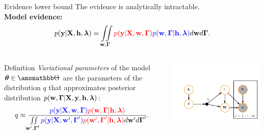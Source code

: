 \documentclass[usenames,dvipsnames,11pt,pdf,utf8,russian,aspectratio=169]{beamer}
\begin{document}
\begin{frame}{Evidence lower bound} 
\footnotesize
The evidence is analytically intractable.\\
\textbf{Model evidence:}
\[
p(\mathbf{y}|\mathbf{X}, \mathbf{h}, \boldsymbol{\lambda}) =
 \iint\limits_{\mathbf{w}, \boldsymbol{\Gamma}}  \textcolor{red}{p(\mathbf{y}|\mathbf{X},\mathbf{w},  \boldsymbol{\Gamma})} \textcolor{blue}{p(\mathbf{w}, \boldsymbol{\Gamma}|\mathbf{h}, \boldsymbol{\lambda})}d\mathbf{w}d{\boldsymbol{\Gamma}}.                         
\]

\begin{columns}
\begin{column}{0.55\textwidth}
  
\begin{block}{Definition}
\textit{Variational parameters} of the model $\boldsymbol{\theta} \in \Tetab$ are the parameters of the distribution $q$ that approximates posterior distribution $p(\mathbf{w}, \boldsymbol{\Gamma}|\mathbf{X}, \mathbf{y}, \mathbf{h}, \boldsymbol{\lambda})$:
\[
    q \approx  \frac{\textcolor{blue}{p(\mathbf{y}|\mathbf{X},\mathbf{w},\boldsymbol{\Gamma})}\textcolor{red}{p(\mathbf{w}, \boldsymbol{\Gamma}|\mathbf{h}, \boldsymbol{\lambda})}}{\iint\limits_{\mathbf{w}', \boldsymbol{\Gamma'}}\textcolor{blue}{p(\mathbf{y}|\mathbf{X},\mathbf{w}',\boldsymbol{\Gamma}')}\textcolor{red}{p(\mathbf{w}', \boldsymbol{\Gamma}'|\mathbf{h}, \boldsymbol{\lambda})}d\mathbf{w}'d\boldsymbol{\Gamma}'}.
\]
\end{block} 

\end{column}
\begin{column}{0.45\textwidth}  %
    \begin{center}
     \includegraphics[width=\textwidth]{plate.pdf}
     \end{center}
\end{column}
\end{columns}




\end{frame}
\end{document}
